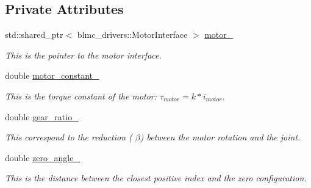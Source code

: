 \subsection*{Private Attributes}
\begin{DoxyCompactItemize}
\item 
\mbox{\label{classblmc__robots_1_1BlmcJointModule_a0ff5ce1cb26ed04212914dc152ec0486}} 
std\+::shared\+\_\+ptr$<$ blmc\+\_\+drivers\+::\+Motor\+Interface $>$ \hyperlink{classblmc__robots_1_1BlmcJointModule_a0ff5ce1cb26ed04212914dc152ec0486}{motor\+\_\+}
\begin{DoxyCompactList}\small\item\em This is the pointer to the motor interface. \end{DoxyCompactList}\item 
\mbox{\label{classblmc__robots_1_1BlmcJointModule_a4e2e6f6cc7f0f7aed02efdca60394b40}} 
double \hyperlink{classblmc__robots_1_1BlmcJointModule_a4e2e6f6cc7f0f7aed02efdca60394b40}{motor\+\_\+constant\+\_\+}
\begin{DoxyCompactList}\small\item\em This is the torque constant of the motor\+: $ \tau_{motor} = k * i_{motor} $. \end{DoxyCompactList}\item 
double \hyperlink{classblmc__robots_1_1BlmcJointModule_af013668d69e7cea2dcc21da8c1c9e4e6}{gear\+\_\+ratio\+\_\+}
\begin{DoxyCompactList}\small\item\em This correspond to the reduction ( $ \beta $) between the motor rotation and the joint. \end{DoxyCompactList}\item 
\mbox{\label{classblmc__robots_1_1BlmcJointModule_abdf774193a8ae31486e937eb432dc702}} 
double \hyperlink{classblmc__robots_1_1BlmcJointModule_abdf774193a8ae31486e937eb432dc702}{zero\+\_\+angle\+\_\+}
\begin{DoxyCompactList}\small\item\em This is the distance between the closest positive index and the zero configuration. \end{DoxyCompactList}\item 
\mbox{\label{classblmc__robots_1_1BlmcJointModule_a6ec97901099ebcc3466851624c656f08}} 

\end{DoxyCompactItemize}
